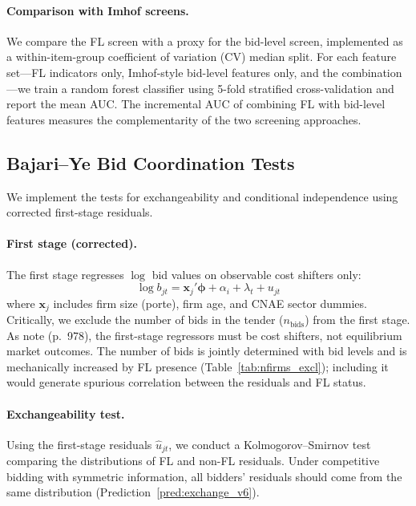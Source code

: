 \paragraph{Comparison with Imhof screens.}
We compare the FL screen with a proxy for the \citet{imhof2019detecting}
bid-level screen, implemented as a within-item-group coefficient of
variation (CV) median split. For each feature set---FL indicators only,
Imhof-style bid-level features only, and the combination---we train a
random forest classifier using 5-fold stratified cross-validation and
report the mean AUC. The incremental AUC of combining FL with bid-level
features measures the complementarity of the two screening approaches.


\subsection{Bajari--Ye Bid Coordination Tests}
\label{sec:bajari_ye}

We implement the \citet{bajari2003deciding} tests for exchangeability
and conditional independence using corrected first-stage residuals.

\paragraph{First stage (corrected).} %
The first stage regresses $\log$ bid values on observable cost shifters
only:
\begin{equation}
  \log b_{jt} = \mathbf{x}_j'\boldsymbol{\phi} + \alpha_i + \lambda_t
  + u_{jt}
  \label{eq:by_first_stage}
\end{equation}
where $\mathbf{x}_j$ includes firm size (porte), firm age, and CNAE
sector dummies. Critically, we exclude the number of bids in the
tender ($n_{\text{bids}}$) from the first stage. As
\citet{bajari2003deciding} note (p.~978), the first-stage regressors
must be cost shifters, not equilibrium market outcomes. The number of
bids is jointly determined with bid levels and is mechanically increased
by FL presence (Table~\ref{tab:nfirms_excl}); including it would
generate spurious correlation between the residuals and FL status.

\paragraph{Exchangeability test.}
Using the first-stage residuals $\hat{u}_{jt}$, we conduct a
Kolmogorov--Smirnov test comparing the distributions of FL and non-FL
residuals. Under competitive bidding with symmetric information, all
bidders' residuals should come from the same distribution
(Prediction~\ref{pred:exchange_v6}).

